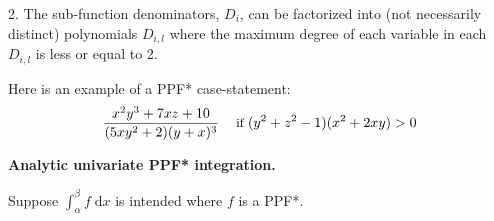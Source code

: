 \documentclass[]{article}
\renewcommand{\vec}[1]{\mathbf{#1}}
\newcommand{\singlecase}[2]{#2 \quad \text{ if } #1}
\newcommand{\dd}{\;\mathrm{d}} %
\begin{document}
2. The sub-function denominators, $D_{i}$, can be factorized into (not necessarily distinct) polynomials ${D}_{i,l}$ where the maximum degree of each variable in each $D_{i,l}$ is less or equal to 2.

Here is an example of a PPF* case-statement:
\begin{equation}\vspace{-0.5mm}
{\footnotesize
\label{e:ppf*example}
\singlecase{(y^2+z^2 -1)(x^2+2xy) > 0}
{\frac{x^2 y^3 + 7xz + 10}{(5xy^2 + 2)(y + x)^3}}
}
\end{equation}



{\bf Analytic univariate PPF* integration.} 

Suppose $\int_{\alpha}^\beta f \dd x$ is intended where $f$ is a PPF*.
\end{document}
